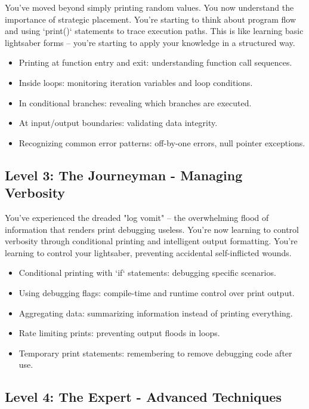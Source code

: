 \documentclass{article}
\begin{document}
{{{{You've moved beyond simply printing random values. You now understand the importance of strategic placement. You're starting to think about program flow and using `print()` statements to trace execution paths. This is like learning basic lightsaber forms – you're starting to apply your knowledge in a structured way.

\begin{itemize}
    \item Printing at function entry and exit: understanding function call sequences.
    \item Inside loops: monitoring iteration variables and loop conditions.
    \item In conditional branches: revealing which branches are executed.
    \item At input/output boundaries: validating data integrity.
    \item Recognizing common error patterns:  off-by-one errors, null pointer exceptions.
\end{itemize}

\subsection*{Level 3: The Journeyman - Managing Verbosity}

You've experienced the dreaded "log vomit" – the overwhelming flood of information that renders print debugging useless. You're now learning to control verbosity through conditional printing and intelligent output formatting. You're learning to control your lightsaber, preventing accidental self-inflicted wounds.

\begin{itemize}
    \item Conditional printing with `if` statements:  debugging specific scenarios.
    \item Using debugging flags: compile-time and runtime control over print output.
    \item Aggregating data: summarizing information instead of printing everything.
    \item Rate limiting prints: preventing output floods in loops.
    \item Temporary print statements: remembering to remove debugging code after use.
\end{itemize}

\subsection*{Level 4: The Expert - Advanced Techniques}

}}}}
\end{document}
